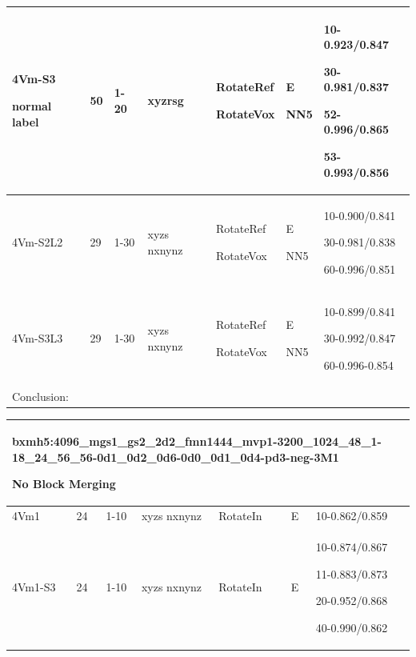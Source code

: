 \documentclass[,table,dvipsnames]{article}
\begin{document}
\begin{tabular}{|p{1.5cm}|p{1.5cm}|p{1cm}|p{1.5cm}|p{1.5cm}|p{1.5cm}|p{5cm}| }
	\hline
	4Vm-S3\par normal label & 50 & 1-20 & xyzrsg& RotateRef\par RotateVox & E\par NN5 & 10-0.923/0.847\par 30-0.981/0.837\par 52-0.996/0.865\par 53-0.993/0.856\\
	\hline\hline 
	
	4Vm-S2L2 & 29& 1-30 & xyzs nxnynz & RotateRef\par RotateVox & E\par NN5 & 10-0.900/0.841\par 30-0.981/0.838\par 60-0.996/0.851\\
	\hline
	4Vm-S3L3 & 29& 1-30 & xyzs nxnynz & RotateRef\par RotateVox & E\par NN5 & 10-0.899/0.841\par 30-0.992/0.847\par 60-0.996-0.854\\
	\hline
	
	\multicolumn{7}{|p{16cm}|}{ Conclusion:\par	} \\
	\hline 	
\end{tabular}

\noindent
\begin{tabular}{|p{1.5cm}|p{1.5cm}|p{1cm}|p{1.5cm}|p{1.5cm}|p{1.5cm}|p{5cm}| }
	\hline 
	\multicolumn{7}{|p{14cm}|}{bxmh5:4096\_mgs1\_gs2\_2d2\_fmn1444\_mvp1-3200\_1024\_48\_1-18\_24\_56\_56-0d1\_0d2\_0d6-0d0\_0d1\_0d4-pd3-neg-3M1\par No Block Merging }\\
	\hline
	4Vm1 & 24 & 1-10 & xyzs nxnynz & RotateIn & E & 10-0.862/0.859\\
	\hline
	4Vm1-S3 & 24 & 1-10 & xyzs nxnynz & RotateIn & E & 10-0.874/0.867\par 11-0.883/0.873\par 20-0.952/0.868\par 40-0.990/0.862\\
	\hline 
\end{tabular}
\end{document}
